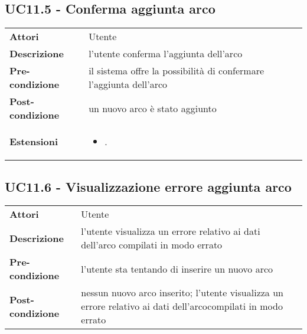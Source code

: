 \subsection{UC11.5 - Conferma aggiunta arco}
\label{sssec:UC11.5}
\def\arraystretch{1.5}
\begin{tabularx}{\textwidth}{l|p{}}
\rowcolor{I} \multicolumn{2}{c}{\color{white}\textbf{UC11.5 - Conferma aggiunta arco}} \\
\toprule
\endhead
\textbf{Attori} & Utente\\
\textbf{Descrizione} & l'utente conferma l'aggiunta dell'arco\\
\textbf{Pre-condizione} & il sistema offre la possibilità di confermare l'aggiunta dell'arco\\
\textbf{Post-condizione} & un nuovo arco è stato aggiunto\\
\textbf{Estensioni} & \vspace{-1.2em}\begin{itemize}[leftmargin=*,noitemsep,nosep]
\item \nameref{sssec:UC11.6}.
\end{itemize}\\
\bottomrule
\end{tabularx}
\subsection{UC11.6 - Visualizzazione errore aggiunta arco}
\label{sssec:UC11.6}
\def\arraystretch{1.5}
\begin{tabularx}{\textwidth}{l|p{}}
\rowcolor{I} \multicolumn{2}{c}{\color{white}\textbf{UC11.6 - Visualizzazione errore aggiunta arco}} \\
\toprule
\endhead
\textbf{Attori} & Utente\\
\textbf{Descrizione} & l'utente visualizza un errore relativo ai dati dell'arco compilati in modo errato\\
\textbf{Pre-condizione} & l'utente sta tentando di inserire un nuovo arco\\
\textbf{Post-condizione} & nessun nuovo arco inserito; l'utente visualizza un errore relativo ai dati dell'arcocompilati in modo errato\\
\bottomrule
\end{tabularx}
